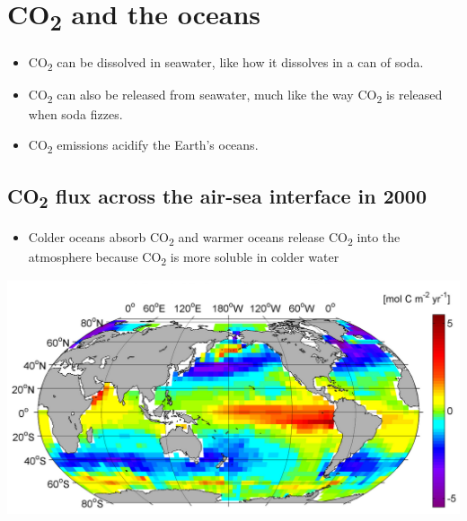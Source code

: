 \documentclass[11pt]{article}
\begin{document}
\section{CO\textsubscript{2} and the oceans}
\label{sec:orgdf645d7}
\begin{itemize}
\item CO\textsubscript{2} can be dissolved in seawater, like how it dissolves in a can of soda.
\item CO\textsubscript{2} can also be released from seawater, much like the way CO\textsubscript{2} is released when soda fizzes.
\item CO\textsubscript{2} emissions acidify the Earth's oceans.
\end{itemize}

\subsection{CO\textsubscript{2} flux across the air-sea interface in 2000}
\label{sec:org87cd854}
\begin{itemize}
\item Colder oceans absorb CO\textsubscript{2} and warmer oceans release CO\textsubscript{2} into the atmosphere because CO\textsubscript{2} is more soluble in colder water
\end{itemize}
\begin{center}
\includegraphics[width=.9\linewidth]{./images/co-2-flux-map.png}
\end{center}
\end{document}
